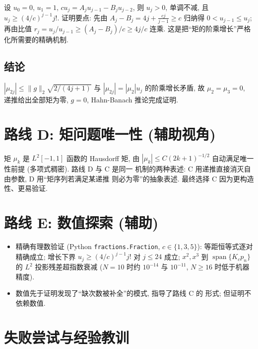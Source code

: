 \documentclass[UTF8]{ctexart}
\begin{document}
设 $u_0 = 0$, $u_1 = 1$, $cu_j = A_j u_{j-1} - B_j u_{j-2}$, 则
$u_j > 0$, 单调不减, 且 $u_j \geq (4/c)^{j-1} j!$.
证明要点: 先由 $A_j - B_j = 4j + \tfrac{cj}{j-1} \geq c$ 归纳得
$0 < u_{j-1} \leq u_j$; 再由比值 $r_j = u_j/u_{j-1} \geq (A_j - B_j)/c
\geq 4j/c$ 连乘. 这是把``矩的阶乘增长''严格化所需要的精确机制.

\subsection{结论}

$|\mu_{2j}| \leq \|g\|_2 \sqrt{2/(4j+1)}$ 与 $|\mu_{2j}| = |\mu_2| u_j$
的阶乘增长矛盾, 故 $\mu_2 = \mu_3 = 0$, 递推给出全部矩为零,
$g = 0$, Hahn-Banach 推论完成证明.

\section{路线 D: 矩问题唯一性 (辅助视角)}

矩 $\mu_k$ 是 $L^2[-1,1]$ 函数的 Hausdorff 矩, 由 $|\mu_k| \leq
C(2k+1)^{-1/2}$ 自动满足唯一性前提 (多项式稠密). 路线 D 与 C 是同一
机制的两种表述: C 用递推直接消灭自由参数, D 用``矩序列若满足某递推
则必为零''的抽象表述. 最终选择 C 因为更构造性、更易验证.

\section{路线 E: 数值探索 (辅助)}

\begin{itemize}
	\item 精确有理数验证 (Python \texttt{fractions.Fraction}, $c \in \{1,3,5\}$):
		等距恒等式逐对精确成立; 增长下界 $u_j \geq (4/c)^{j-1}j!$
		对 $j \leq 24$ 成立; $x^2, x^3$ 到 $\operatorname{span}\{K_c p_n\}$
		的 $L^2$ 投影残差超指数衰减 ($N = 10$ 时约 $10^{-14}$ 与
		$10^{-11}$, $N \geq 16$ 时低于机器精度).
	\item 数值先于证明发现了``缺次数被补全''的模式, 指导了路线 C 的
		形式; 但证明不依赖数值.
\end{itemize}

\section{失败尝试与经验教训}
\end{document}
